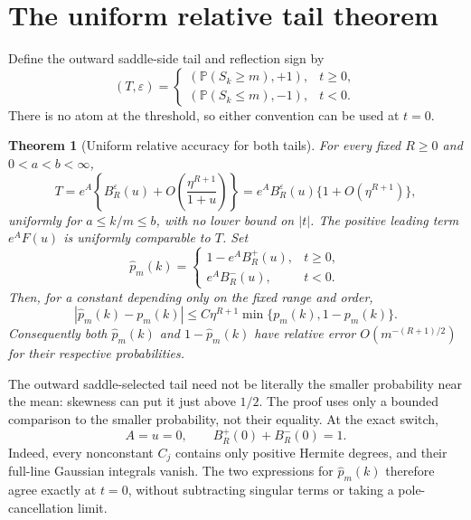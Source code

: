 \documentclass[11pt]{article}
\numberwithin{equation}{section}
\newtheorem{theorem}{Theorem}[section]
\theoremstyle{remark}\newtheorem{remark}[theorem]{Remark}
\newcommand{\Prob}{\mathbb P}\newcommand{\E}{\mathbb E}\newcommand{\He}{\operatorname{He}}
\begin{document}
\section{The uniform relative tail theorem}\label{brs:un:sec:theorem}

Define the outward saddle-side tail and reflection sign by
\begin{equation}\label{brs:un:eq:T}
 (T,\varepsilon)=
 \begin{cases}
  (\Prob(S_k\ge m),+1),&t\ge0,\\
  (\Prob(S_k\le m),-1),&t<0.
 \end{cases}
\end{equation}
There is no atom at the threshold, so either convention can be used
at $t=0$.

\begin{theorem}[Uniform relative accuracy for both tails]\label{brs:un:thm:uniform}
For every fixed $R\ge0$ and $0<a<b<\infty$,
\begin{equation}\label{brs:un:eq:U}
 T=e^A\left\{B_R^\varepsilon(u)
        +O\left(\frac{\eta^{R+1}}{1+u}\right)\right\}
   =e^AB_R^\varepsilon(u)\{1+O(\eta^{R+1})\},
\end{equation}
uniformly for $a\le k/m\le b$, with no lower bound on $|t|$.
The positive leading term $e^AF(u)$ is uniformly comparable to $T$.
Set
\begin{equation}\label{brs:un:eq:phat}
 \widehat p_m(k)=
 \begin{cases}
  1-e^AB_R^+(u),&t\ge0,\\
  e^AB_R^-(u),&t<0.
 \end{cases}
\end{equation}
Then, for a constant depending only on the fixed range and order,
\begin{equation}\label{brs:un:eq:both}
 |\widehat p_m(k)-p_m(k)|
 \le C\eta^{R+1}\min\{p_m(k),1-p_m(k)\}.
\end{equation}
Consequently both $\widehat p_m(k)$ and $1-\widehat p_m(k)$ have
relative error $O(m^{-(R+1)/2})$ for their respective probabilities.
\end{theorem}

The outward saddle-selected tail need not be literally the smaller
probability near the mean: skewness can put it just above $1/2$.
The proof uses only a bounded comparison to the smaller probability,
not their equality.  At the exact switch,
\begin{equation}\label{brs:un:eq:complement}
 A=u=0,\qquad B_R^+(0)+B_R^-(0)=1.
\end{equation}
Indeed, every nonconstant $C_j$ contains only positive Hermite degrees,
and their full-line Gaussian integrals vanish.  The two expressions
for $\widehat p_m(k)$ therefore agree exactly at $t=0$, without
subtracting singular terms or taking a pole-cancellation limit.
\end{document}
